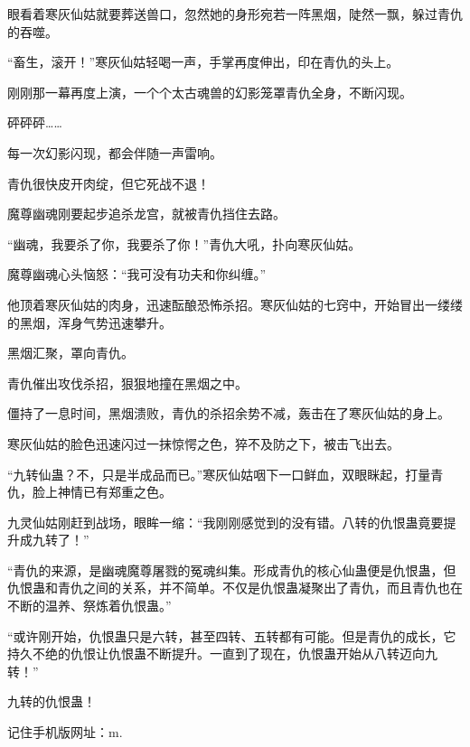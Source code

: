 \begin{this_body}
眼看着寒灰仙姑就要葬送兽口，忽然她的身形宛若一阵黑烟，陡然一飘，躲过青仇的吞噬。

“畜生，滚开！”寒灰仙姑轻喝一声，手掌再度伸出，印在青仇的头上。

刚刚那一幕再度上演，一个个太古魂兽的幻影笼罩青仇全身，不断闪现。

砰砰砰……

每一次幻影闪现，都会伴随一声雷响。

青仇很快皮开肉绽，但它死战不退！

魔尊幽魂刚要起步追杀龙宫，就被青仇挡住去路。

“幽魂，我要杀了你，我要杀了你！”青仇大吼，扑向寒灰仙姑。

魔尊幽魂心头恼怒：“我可没有功夫和你纠缠。”

他顶着寒灰仙姑的肉身，迅速酝酿恐怖杀招。寒灰仙姑的七窍中，开始冒出一缕缕的黑烟，浑身气势迅速攀升。

黑烟汇聚，罩向青仇。

青仇催出攻伐杀招，狠狠地撞在黑烟之中。

僵持了一息时间，黑烟溃败，青仇的杀招余势不减，轰击在了寒灰仙姑的身上。

寒灰仙姑的脸色迅速闪过一抹惊愕之色，猝不及防之下，被击飞出去。

“九转仙蛊？不，只是半成品而已。”寒灰仙姑咽下一口鲜血，双眼眯起，打量青仇，脸上神情已有郑重之色。

九灵仙姑刚赶到战场，眼眸一缩：“我刚刚感觉到的没有错。八转的仇恨蛊竟要提升成九转了！”

“青仇的来源，是幽魂魔尊屠戮的冤魂纠集。形成青仇的核心仙蛊便是仇恨蛊，但仇恨蛊和青仇之间的关系，并不简单。不仅是仇恨蛊凝聚出了青仇，而且青仇也在不断的温养、祭炼着仇恨蛊。”

“或许刚开始，仇恨蛊只是六转，甚至四转、五转都有可能。但是青仇的成长，它持久不绝的仇恨让仇恨蛊不断提升。一直到了现在，仇恨蛊开始从八转迈向九转！”

九转的仇恨蛊！

记住手机版网址：m.

\end{this_body}

